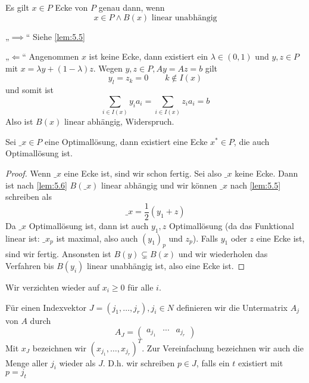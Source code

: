 \documentclass{mycourse}
\begin{document}
\begin{lem}
	\label{lem:5.6}
	Es gilt $x\in P$ Ecke von $P$ genau dann, wenn
	\[
		x\in P \land B(x) \text{ linear unabhängig}
	\]
	\begin{seg}{„$\implies$“}
		Siehe \ref{lem:5.5}
	\end{seg}
	\begin{seg}{„$\Longleftarrow$“}
		Angenommen $x$ ist keine Ecke, dann existiert ein $\lambda\in (0,1)$ und $y,z\in P$ mit $x=\lambda y + (1-\lambda)z$.
		Wegen $y,z\in P, Ay = Az = b$ gilt
		\[
			y_l = z_k = 0 \qquad k\not\in I(x)
		\]
		und somit ist
		\[
			\sum_{i\in I(x)}y_i a_i = \sum_{i\in I(x)}z_ia_i = b
		\]
		Also ist $B(x)$ linear abhängig, Widerspruch.
	\end{seg}
\end{lem}

\begin{st}
	Sei $\_x\in P$ eine Optimallösung, dann existiert eine Ecke $x^*\in P$, die auch Optimallösung ist.
	\begin{proof}
		Wenn $\_x$ eine Ecke ist, sind wir schon fertig.
		Sei also $\_x$ keine Ecke.
		Dann ist nach \ref{lem:5.6} $B(\_x)$ linear abhängig und wir können $\_x$ nach \ref{lem:5.5} schreiben als
		\[
			\_x = \frac 12(y_1 + z)
		\]
		Da $\_x$ Optimallösung ist, dann ist auch $y_1,z$ Optimallösung (da das Funktional linear ist: $\_x_p$ ist maximal, also auch $(y_1)_p$ und $z_p$).
		Falls $y_1$ oder $z$ eine Ecke ist, sind wir fertig.
		Ansonsten ist $B(y)\subsetneq B(x)$ und wir wiederholen das Verfahren bis $B(y_i)$ linear unabhängig ist, also eine Ecke ist.
	\end{proof}
\end{st}

Wir verzichten wieder auf $x_i\ge 0$ für alle $i$.

Für einen Indexvektor $J=(j_1,\dotsc, j_r), j_i\in N$ definieren wir die Untermatrix $A_j$ von $A$ durch
\[
	A_J = \begin{pmatrix}a_{j_1} & \cdots & a_{j_r}\end{pmatrix}
\]
Mit $x_J$ bezeichnen wir $(x_{j_1},\dotsc,x_{j_r})^T$.
Zur Vereinfachung bezeichnen wir auch die Menge aller $j_i$ wieder als $J$.
D.h. wir schreiben $p\in J$, falls ein $t$ existiert mit $p=j_t$
\end{document}
